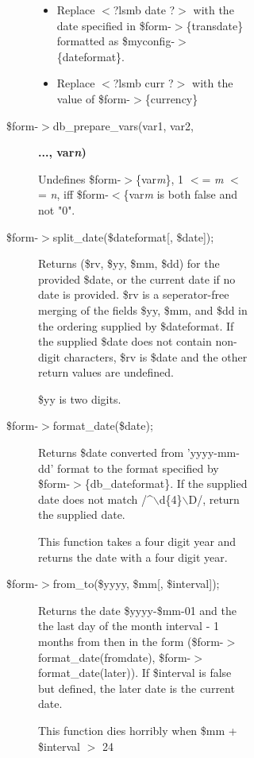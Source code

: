 \begin{description}
\begin{description}
\begin{description}
\begin{description}
\begin{description}
\begin{description}
\begin{itemize}
\item 

Replace $<$?lsmb date ?$>$ with the date specified in \$form-$>$\{transdate\} formatted
as \$myconfig-$>$\{dateformat\}.


\item 

Replace $<$?lsmb curr ?$>$ with the value of \$form-$>$\{currency\}

\end{itemize}

\item[{\$form-$>$db\_prepare\_vars(var1, var2,}] \textbf{..., var\textit{n})}

Undefines \$form-$>$\{var\textit{m}\}, 1 $<$= \textit{m} $<$= \textit{n}, iff \$form-$<$\{var\textit{m} is both
false and not "0".


\item[{\$form-$>$split\_date(\$dateformat[, \$date]);}] \mbox{}

Returns (\$rv, \$yy, \$mm, \$dd) for the provided \$date, or the current date if no
date is provided.  \$rv is a seperator-free merging of the fields \$yy, \$mm, and
\$dd in the ordering supplied by \$dateformat.  If the supplied \$date does not
contain non-digit characters, \$rv is \$date and the other return values are
undefined.



\$yy is two digits.


\item[{\$form-$>$format\_date(\$date);}] \mbox{}

Returns \$date converted from 'yyyy-mm-dd' format to the format specified by
\$form-$>$\{db\_dateformat\}.  If the supplied date does not match /\^{}$\backslash$d\{4\}$\backslash$D/,
return the supplied date.



This function takes a four digit year and returns the date with a four digit
year.


\item[{\$form-$>$from\_to(\$yyyy, \$mm[, \$interval]);}] \mbox{}

Returns the date \$yyyy-\$mm-01 and the the last day of the month interval - 1
months from then in the form (\$form-$>$format\_date(fromdate),
\$form-$>$format\_date(later)).  If \$interval is false but defined, the later date
is the current date.



This function dies horribly when \$mm + \$interval $>$ 24



\end{description}
\end{description}
\end{description}
\end{description}
\end{description}
\end{description}
